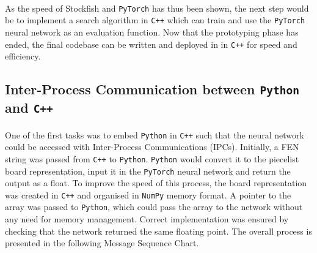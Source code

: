 \documentclass[12pt,a4paper]{book}
\begin{document}
\paragraph{} As the speed of Stockfish and \texttt{PyTorch} has thus been shown, the next step would be to implement a search algorithm in \texttt{C++} which can train and use the \texttt{PyTorch} neural network as an evaluation function. Now that the prototyping phase has ended, the final codebase can be written and deployed in in \texttt{C++} for speed and efficiency.

\subsection{Inter-Process Communication between \texttt{Python} and \texttt{C++}}

\paragraph{} One of the first tasks was to embed \texttt{Python} in \texttt{C++} such that the neural network could be accessed with Inter-Process Communications (IPCs). Initially, a FEN string was passed from \texttt{C++} to \texttt{Python}. \texttt{Python} would convert it to the piecelist board representation, input it in the \texttt{PyTorch} neural network and return the output as a float. To improve the speed of this process, the board representation was created in \texttt{C++} and organised in \texttt{NumPy} memory format. A pointer to the array was passed to \texttt{Python}, which could pass the array to the network without any need for memory management. Correct implementation was ensured by checking that the network returned the same floating point. The overall process is presented in the following Message Sequence Chart.
\end{document}
